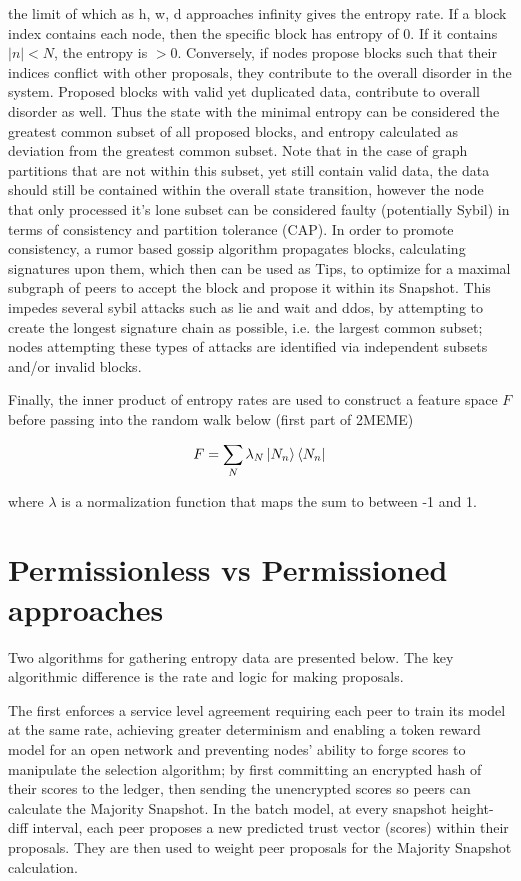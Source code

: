 \documentclass{article}
\begin{document}
	the limit of which as h, w, d approaches infinity gives the entropy rate.
If a block index contains each node, then the specific block has entropy of 0. If it contains $|n| < N$, the entropy is $> 0$. Conversely, if nodes propose blocks such that their indices conflict with other proposals, they contribute to the overall disorder in the system. Proposed blocks with valid yet duplicated data, contribute to overall disorder as well. Thus the state with the minimal entropy can be considered the greatest common subset of all proposed blocks, and entropy calculated as deviation from the greatest common subset. Note that in the case of graph partitions that are not within this subset, yet still contain valid data, the data should still be contained within the overall state transition, however the node that only processed it’s lone subset can be considered faulty (potentially Sybil) in terms of consistency and partition tolerance (CAP). In order to promote consistency, a rumor based gossip algorithm propagates blocks, calculating signatures upon them, which then can be used as Tips, to optimize for a maximal subgraph of peers to accept the block and propose it within its Snapshot. This impedes several sybil attacks such as lie and wait and ddos, by attempting to create the longest signature chain as possible, i.e. the largest common subset; nodes attempting these types of attacks are identified via independent subsets and/or invalid blocks.

Finally, the inner product of entropy rates are used to construct a feature space $F$ before passing into the random walk below (first part of 2MEME)

\begin{equation}
F = \sum_N \lambda_N \ket{N_n} \bra{N_n}
\end{equation}

where $\lambda$ is a normalization function that maps the sum to between -1 and 1.

\section {Permissionless vs Permissioned approaches}
Two algorithms for gathering entropy data are presented below. The key algorithmic difference is the rate and logic for making proposals. 

The first enforces a service level agreement requiring each peer to train its model at the same rate, achieving greater determinism and enabling a token reward model for an open network and preventing nodes' ability to forge scores to manipulate the selection algorithm; by first committing an encrypted hash of their scores to the ledger, then sending the unencrypted scores so peers can calculate the Majority Snapshot. In the batch model, at every snapshot height-diff interval, each peer proposes a new predicted trust vector (scores) within their proposals. They are then used to weight peer proposals for the Majority Snapshot calculation.
\end{document}
